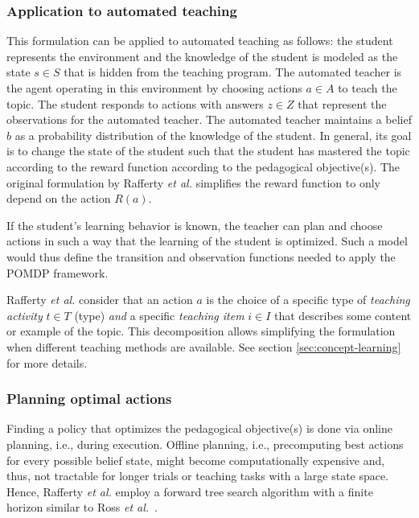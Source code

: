 \subsubsection{Application to automated teaching}

This formulation can be applied to automated teaching as follows: the student represents the environment and the knowledge of the student is modeled as the state $s \in S$ that is hidden from the teaching program.
The automated teacher is the agent operating in this environment by choosing actions $a \in A$ to teach the topic.
The student responds to actions with answers $z \in Z$ that represent the observations for the automated teacher.
The automated teacher maintains a belief $b$ as a probability distribution of the knowledge of the student.
In general, its goal is to change the state of the student such that the student has mastered the topic %
according to the reward function according to the pedagogical objective(s).
The original formulation by Rafferty \textit{et al.} simplifies the reward function to only depend on the action $R(a)$.

If the student's learning behavior is known, the teacher can plan and choose actions in such a way that the learning of the student is optimized. 
Such a model would thus define the transition and observation functions needed to apply the POMDP framework.


Rafferty \textit{et al.} consider that an action $a$ is the choice of a specific type of \textit{teaching activity} $t \in T$ (type) \textit{and} a specific \textit{teaching item} $i \in I$ that describes some content or example of the topic.
This decomposition allows simplifying the formulation when different teaching methods are available.
See section \ref{sec:concept-learning} for more details.


\subsubsection{Planning optimal actions}
\label{sec:planning}

Finding a policy that optimizes the pedagogical objective(s) is done via online planning, i.e., during execution. Offline planning, i.e., precomputing best actions for every possible belief state, might become computationally expensive and, thus, not tractable for longer trials or teaching tasks with a large state space. 
Hence, Rafferty \textit{et al.} employ a forward tree search algorithm with a finite horizon similar to Ross \textit{et al.}~\cite{rossPomdp2008}.

